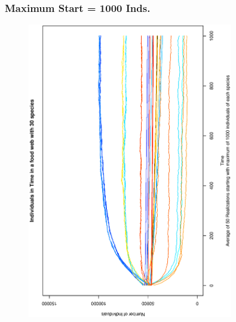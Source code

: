 \documentclass[xcolor=x11names,compress]{beamer}
\renewcommand{\(}{\begin{columns}}
\renewcommand{\)}{\end{columns}}
\newcommand{\<}[1]{\begin{column}{#1}}
\renewcommand{\>}{\end{column}}
\begin{document}
\begin{frame}
\frametitle{Maximum Start = 1000 Inds.}
\begin{figure}
\includegraphics[angle=270,width=0.8\textwidth]{./AverIndInTime_50Real_1000Ind.eps}
\end{figure}
\end{frame}

%
%
\end{document}
